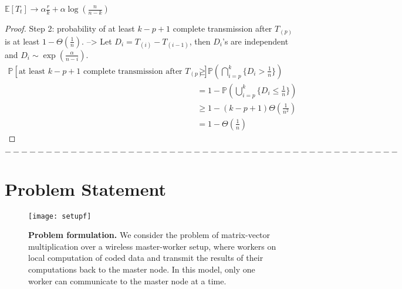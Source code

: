 \documentclass[onecolumn,journal,twoside]{IEEEtran}
\newcommand{\Expc}{\mathbb{E}}
\begin{document}
\begin{theorem}
$ \Expc[T_t] \to \alpha \frac{r}{k} + \alpha \log(\frac{n}{n-k})$
\end{theorem}
\begin{proof}

Step 2: probability of at least $k-p+1$ complete transmission after $T_{(p)}$ is at least $1-\Theta(\frac{1}{n})$. --> Let $D_i=T_{(i)}-T_{(i-1)}$, then $D_i$'s are independent and $D_i \sim \exp(\frac{\alpha}{n-i}) $.
\begin{align}
    \mathbb{P}[ \text{at least $k-p+1$ complete transmission after $T_{(p)}$} ] & \geq \mathbb{P}(\bigcap^k_{i=p} \{D_i > \frac{1}{n}\})\\
    &= 1-\mathbb{P}(\bigcup^k_{i=p} \{D_i \leq \frac{1}{n}\}) \\
    & \geq 1 - (k-p+1) \Theta(\frac{1}{n^2}) \\
    &= 1- \Theta(\frac{1}{n})
\end{align}
    
\end{proof}

$$------------------------------------------------$$
\fi 
\section{Problem Statement}

\begin{figure}
 \begin{center}
 \texttt{[image: setupf]}
    \caption{\small{\textbf{Problem formulation.} We consider the problem of matrix-vector multiplication over a wireless master-worker setup, where workers on local computation of coded data and transmit the results of their computations back to the master node. In this model, only one worker can communicate to the master node at a time.}}
    \label{fig:setup}
    \end{center}
\end{figure}
  
\end{document}
